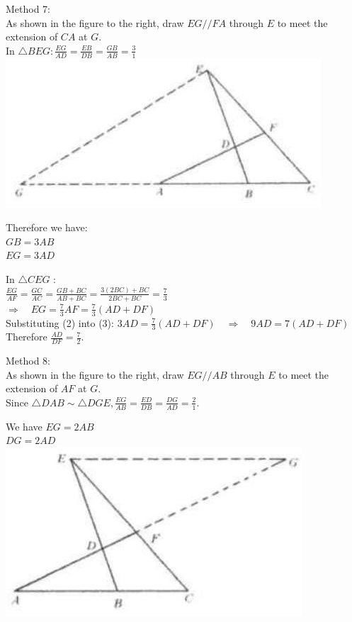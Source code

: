 \documentclass{article}
\begin{document}
Method 7:\\
As shown in the figure to the right, draw \(E G / / F A\) through \(E\) to meet the extension of \(C A\) at \(G\).\\
In \(\triangle B E G: \frac{E G}{A D}=\frac{E B}{D B}=\frac{G B}{A B}=\frac{3}{1}\)\\
\centering
\includegraphics[width=\textwidth]{images/113(1).jpg}

Therefore we have:\\
\(G B=3 A B\)\\
\(E G=3 A D\)


In \(\triangle C E G\) :\\
\(\frac{E G}{A F}=\frac{G C}{A C}=\frac{G B+B C}{A B+B C}=\frac{3(2 B C)+B C}{2 B C+B C}=\frac{7}{3}\)\\
\(\Rightarrow \quad E G=\frac{7}{3} A F=\frac{7}{3}(A D+D F)\)\\
Substituting (2) into (3): \(3 A D=\frac{7}{3}(A D+D F) \quad \Rightarrow \quad 9 A D=7(A D+D F)\)\\
Therefore \(\frac{A D}{D F}=\frac{7}{2}\).

Method 8:\\
As shown in the figure to the right, draw \(E G / / A B\) through \(E\) to meet the extension of \(A F\) at \(G\).\\
Since \(\triangle D A B \sim \triangle D G E, \frac{E G}{A B}=\frac{E D}{D B}=\frac{D G}{A D}=\frac{2}{1}\).

We have \(E G=2 A B\)\\
\(D G=2 A D\)\\
\centering
\includegraphics[width=\textwidth]{images/114.jpg}
\end{document}
